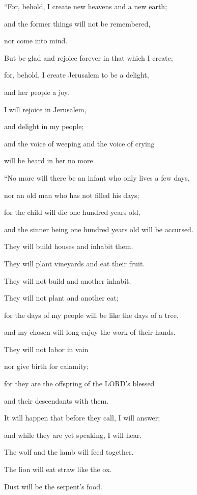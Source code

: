 \vspace{\baselineskip} \myverse{}“For, behold, I create new heavens and a new earth;

and the former things will not be remembered,

nor come into mind.

\myverse{}But be glad and rejoice forever in that which I create;

for, behold, I create Jerusalem to be a delight,

and her people a joy.

\myverse{}I will rejoice in Jerusalem,

and delight in my people;

and the voice of weeping and the voice of crying

will be heard in her no more.


\vspace{\baselineskip} \myverse{}“No more will there be an infant who only lives a few days,

nor an old man who has not filled his days;

for the child will die one hundred years old,

and the sinner being one hundred years old will be accursed.

\myverse{}They will build houses and inhabit them.

They will plant vineyards and eat their fruit.

\myverse{}They will not build and another inhabit.

They will not plant and another eat;

for the days of my people will be like the days of a tree,

and my chosen will long enjoy the work of their hands.

\myverse{}They will not labor in vain

nor give birth for calamity;

for they are the offspring of the LORD’s blessed

and their descendants with them.

\myverse{}It will happen that before they call, I will answer;

and while they are yet speaking, I will hear.

\myverse{}The wolf and the lamb will feed together.

The lion will eat straw like the ox.

Dust will be the serpent’s food.

